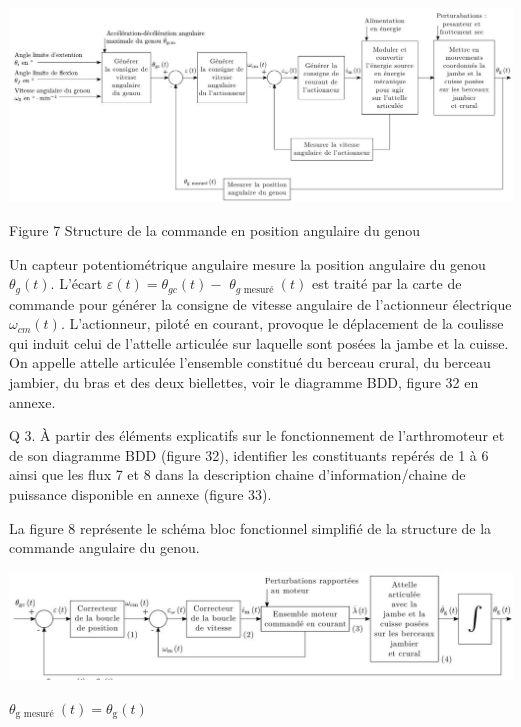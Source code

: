 \documentclass[10pt]{article}
\begin{document}
\begin{center}
\includegraphics[max width=\textwidth]{2024_07_14_a83aebba33898893d39fg-05(1)}
\end{center}

Figure 7 Structure de la commande en position angulaire du genou

Un capteur potentiométrique angulaire mesure la position angulaire du genou $\theta_{g}(t)$. L'écart $\varepsilon(t)=\theta_{g c}(t)-$ $\theta_{g \text { mesuré }}(t)$ est traité par la carte de commande pour générer la consigne de vitesse angulaire de l'actionneur électrique $\omega_{c m}(t)$. L'actionneur, piloté en courant, provoque le déplacement de la coulisse qui induit celui de l'attelle articulée sur laquelle sont posées la jambe et la cuisse. On appelle attelle articulée l'ensemble constitué du berceau crural, du berceau jambier, du bras et des deux biellettes, voir le diagramme BDD, figure 32 en annexe.

Q 3. À partir des éléments explicatifs sur le fonctionnement de l'arthromoteur et de son diagramme BDD (figure 32), identifier les constituants repérés de 1 à 6 ainsi que les flux 7 et 8 dans la description chaine d'information/chaine de puissance disponible en annexe (figure 33).

La figure 8 représente le schéma bloc fonctionnel simplifié de la structure de la commande angulaire du genou.

\begin{center}
\includegraphics[max width=\textwidth]{2024_07_14_a83aebba33898893d39fg-05}
\end{center}

$\theta_{\mathrm{g} \text { mesuré }}(t)=\theta_{\mathrm{g}}(t)$
\end{document}
